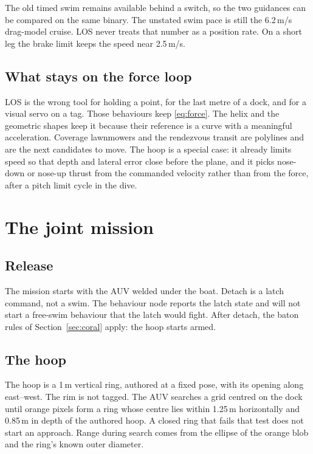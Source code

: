 \documentclass[conference]{IEEEtran}
\begin{document}
The old timed swim remains available behind a switch, so the two guidances can be compared on the same binary. The unstated swim pace is still the 6.2\,m/s drag-model cruise. LOS never treats that number as a position rate. On a short leg the brake limit keeps the speed near 2.5\,m/s.

\subsection{What stays on the force loop}
LOS is the wrong tool for holding a point, for the last metre of a dock, and for a visual servo on a tag. Those behaviours keep \eqref{eq:force}. The helix and the geometric shapes keep it because their reference is a curve with a meaningful acceleration. Coverage lawnmowers and the rendezvous transit are polylines and are the next candidates to move. The hoop is a special case: it already limits speed so that depth and lateral error close before the plane, and it picks nose-down or nose-up thrust from the commanded velocity rather than from the force, after a pitch limit cycle in the dive.

\section{The joint mission}
\label{sec:mission}

\subsection{Release}
The mission starts with the AUV welded under the boat. Detach is a latch command, not a swim. The behaviour node reports the latch state and will not start a free-swim behaviour that the latch would fight. After detach, the baton rules of Section~\ref{sec:coral} apply: the hoop starts armed.

\subsection{The hoop}
The hoop is a 1\,m vertical ring, authored at a fixed pose, with its opening along east--west. The rim is not tagged. The AUV searches a grid centred on the dock until orange pixels form a ring whose centre lies within 1.25\,m horizontally and 0.85\,m in depth of the authored hoop. A closed ring that fails that test does not start an approach. Range during search comes from the ellipse of the orange blob and the ring's known outer diameter.
\end{document}
